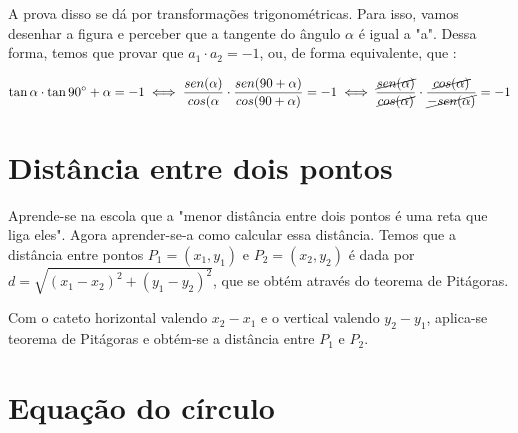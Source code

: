 \documentclass{article}
\begin{document}
A prova disso se dá por transformações trigonométricas. Para isso, vamos desenhar a figura e perceber que a tangente do ângulo $\alpha$ é igual a "a". Dessa forma, temos que provar que $a_1 \cdot a_2 = -1$, ou, de forma equivalente, que : 

$$
\tan{\alpha} \cdot \tan{90^{\circ} + \alpha} = -1 
\iff
\frac{sen(\alpha)}{cos(\alpha} \cdot \frac{sen(90 + \alpha)}{cos(90 + \alpha)} = -1 
\iff
\frac{\cancel{sen(\alpha)}}{\cancel{cos(\alpha)}} \cdot \frac{\cancel{cos(\alpha)}}{\cancel{-sen(\alpha)}} = -1 
\\

$$

\section{Distância entre dois pontos}

Aprende-se na escola que a "menor distância entre dois pontos é uma  reta que liga eles". Agora aprender-se-a como calcular essa distância. Temos que a distância entre pontos $P_1 = (x_1,y_1)$ e $P_2 = (x_2, y_2)$ é dada por $d = \sqrt{(x_1-x_2)^2 + (y_1-y_2)^2}$, que se obtém através do teorema de Pitágoras.
\begin{center}
\end{center}

Com o cateto horizontal valendo $x_2 - x_1$ e o vertical valendo $y_2 - y_1$, aplica-se teorema de Pitágoras e obtém-se a distância entre $P_1 $ e $P_2$.

\section{Equação do círculo}
\end{document}
